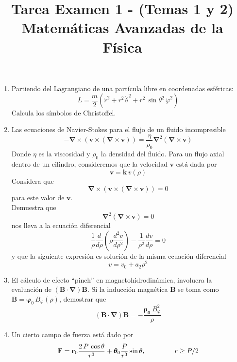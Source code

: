 
\usepackage{standalone}
\usepackage{enumerate}
\usepackage[left=1.5cm,top=1.5cm,right=1.5cm,bottom=1.5cm]{geometry}
\title{Tarea Examen 1 - (Temas 1 y 2) \\ \large{Matemáticas Avanzadas de la Física}}
\date{ }

\vspace{-4cm}
\renewcommand\labelenumii{\theenumi.{\arabic{enumii}}}
\maketitle
\fontsize{14}{14}\selectfont
\begin{enumerate}
\item Partiendo del Lagrangiano de una partícula libre en coordenadas esféricas:
\[ L = \dfrac{m}{2} \left( \dot{r}^{2} + r^{2} \, \dot{\theta}^{2} + r^{2} \, \sin \theta^{2} \, \dot{\varphi}^{2} \right)\]
Calcula los símbolos de Christoffel.
\item Las ecuaciones de Navier-Stokes para el flujo de un fluido incompresible
\[ - \bm{\nabla} \times ( \mathbf{v} \times (\bm{\nabla} \times \mathbf{v} )) =  \dfrac{\eta}{\rho_{0}} \bm{\nabla}^{2} (\bm{\nabla} \times \mathbf{v}) \]
Donde $\eta$ es la viscosidad y $\rho_{0}$ la densidad del fluido. Para un flujo axial dentro de un cilindro, consideremos que la velocidad $\mathbf{v}$ está dada por
\[ \mathbf{v} =  \mathbf{k} \, v (\rho) \]
Considera que
\[ \bm{\nabla} \times (\mathbf{v} \times (\bm{\nabla} \times \mathbf{v})) = 0 \]
para este valor de $\mathbf{v}$.
\\
Demuestra que
\[ \bm{\nabla}^{2} ( \bm{\nabla} \times \mathbf{v}) = 0  \]
nos lleva a la ecuación diferencial
\[ \dfrac{1}{\rho} \dfrac{d}{d \rho} \left( \rho \dfrac{d^{2} v}{d \rho^{2}} \right) -  \dfrac{1}{\rho^{2}} \dfrac{d v}{d \rho} = 0 \]
y que la siguiente expresión es solución de la misma ecuación diferencial
\[ v = v_{0} + a_{2} \rho^{2} \]
\item El cálculo de efecto \enquote{pinch} en magnetohidrodinámica, involucra la evaluación de $(\mathbf{B} \cdot \bm{\nabla}) \mathbf{B}$. Si la inducción magnética $\mathbf{B}$ se toma como $\mathbf{B} = \bm{\varphi}_{0} \, B_{\varphi} (\rho)$, demostrar que
\[ (\mathbf{B} \cdot \bm{\nabla}) \mathbf{B} = - \dfrac{\bm{\rho_{0}} \: B_{\varphi}^{2}}{\rho}	 \]
\item Un cierto campo de fuerza está dado por
\[ \mathbf{F} = \mathbf{r}_{0} \dfrac{2 \, P \, \cos \theta}{r^{3}} + \bm{\theta}_{0} \dfrac{P}{r^{3}} \sin \theta, \hspace{1.5cm} r \geq P/2 \]

\end{enumerate}
